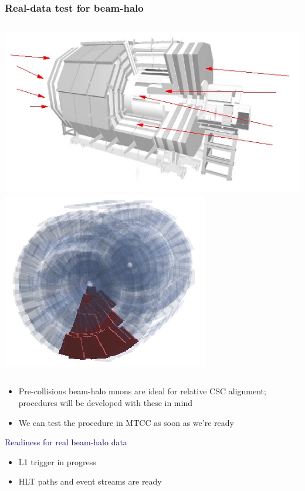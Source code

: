 \documentclass[compress]{beamer}
\begin{document}
\begin{frame}
\frametitle{Real-data test for beam-halo}

\vfill
\begin{columns}
\includegraphics[width=\linewidth]{beam-halo_schematic.png}
\includegraphics[width=\linewidth]{mtcc_chambers.png}
\end{columns}

\begin{itemize}
\item Pre-collisions beam-halo muons are ideal for relative CSC
alignment; procedures will be developed with these in mind
\item We can test the procedure in MTCC as soon as we're ready
\end{itemize}

\vfill
\hspace{-0.83 cm} \textcolor{darkblue}{\Large Readiness for real beam-halo data}
\begin{itemize}
\item L1 trigger in progress
\item HLT paths and event streams are ready
\end{itemize}
\end{frame}
\end{document}
